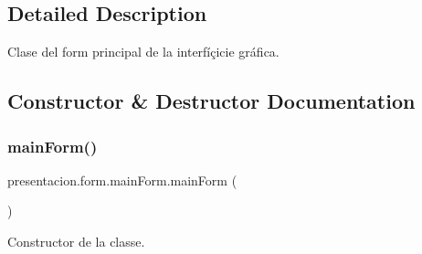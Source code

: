 \subsection{Detailed Description}
Clase del form principal de la interfíçicie gráfica. 

\subsection{Constructor \& Destructor Documentation}
\mbox{\label{classpresentacion_1_1form_1_1mainForm_ac1236f4bc250bf2f5a4a01a072e77555}} 
\subsubsection{\texorpdfstring{main\+Form()}{mainForm()}}
{\footnotesize\ttfamily presentacion.\+form.\+main\+Form.\+main\+Form (\begin{DoxyParamCaption}{ }\end{DoxyParamCaption})\hspace{0.3cm}{\ttfamily [inline]}}



Constructor de la classe. 


